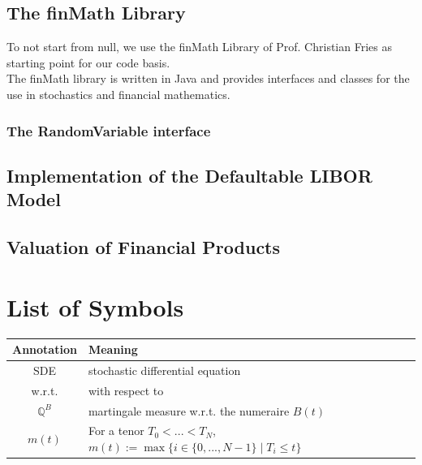 \documentclass[12pt]{article}
\begin{document}
	
	\subsection{The finMath Library}
	To not start from null, we use the finMath Library of Prof. Christian Fries as starting point for our code basis.\\
	The finMath library is written in Java and provides interfaces and classes for the use in stochastics and financial mathematics.
	\subsubsection{The RandomVariable interface}
	
	\subsection{Implementation of the Defaultable LIBOR Model}
	
	\subsection{Valuation of Financial Products}
	
	
	
	
	
	
	\pagebreak
	\section{List of Symbols}
	\begin{tabular}{cl}
		
		Annotation & Meaning \\
		\hline
		SDE & stochastic differential equation \\
		w.r.t. & with respect to \\
		$\mathbb{Q}^B$ & martingale measure w.r.t. the numeraire $B(t)$\\
		$m(t)$ & For a tenor $T_0 < ... < T_N$, $m(t):= \max\{i \in \{0, ..., N-1\} \; | \; T_i \le t \}$\\
		
	\end{tabular}
	\pagebreak
		
		
		
		
		
\end{document}
